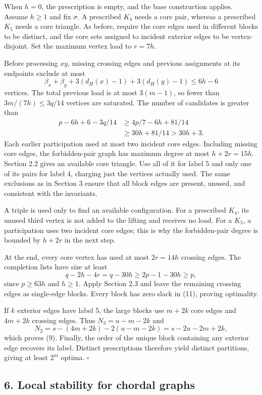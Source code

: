 \documentclass[english,11pt,a4paper]{article}
\begin{document}
When \(h=0\), the prescription is empty, and the base construction
applies. Assume \(h\ge1\) and fix \(\sigma\). A prescribed \(K_4\) needs
a core pair, whereas a prescribed \(K_5\) needs a core triangle. As
before, require the core edges used in different blocks to be distinct,
and the core sets assigned to incident exterior edges to be
vertex-disjoint. Set the maximum vertex load to \(r=7h\).

Before processing \(xy\), missing crossing edges and previous
assignments at its endpoints exclude at most \[
\beta_x+\beta_y+3(d_H(x)-1)+3(d_H(y)-1)\le6h-6
\] vertices. The total previous load is at most \(3(m-1)\), so fewer
than \(3m/(7h)\le3q/14\) vertices are saturated. The number of
candidates is greater than \[
\begin{aligned}
p-6h+6-3q/14
&\ge4p/7-6h+81/14\\
&\ge30h+81/14>30h+3.
\end{aligned} \tag{19}
\] Each earlier participation used at most two incident core edges.
Including missing core edges, the forbidden-pair graph has maximum
degree at most \(h+2r=15h\). Section 2.2 gives an available core
triangle. Use all of it for label 5 and only one of its pairs for label
4, charging just the vertices actually used. The same exclusions as in
Section 3 ensure that all block edges are present, unused, and
consistent with the invariants.

A triple is used only to find an available configuration. For a
prescribed \(K_4\), its unused third vertex is not added to the lifting
and receives no load. For a \(K_5\), a participation uses two incident
core edges; this is why the forbidden-pair degree is bounded by \(h+2r\)
in the next step.

At the end, every core vertex has used at most \(2r=14h\) crossing
edges. The completion lists have size at least \[
q-2h-4r=q-30h\ge2p-1-30h\ge p,
\] since \(p\ge63h\) and \(h\ge1\). Apply Section 2.3 and leave the
remaining crossing edges as single-edge blocks. Every block has zero
slack in (11), proving optimality.

If \(k\) exterior edges have label 5, the large blocks use \(m+2k\) core
edges and \(4m+2k\) crossing edges. Thus \(N_3=u-m-2k\) and \[
N_2=s-(4m+2k)-2(u-m-2k)=s-2u-2m+2k,
\] which proves (9). Finally, the order of the unique block containing
any exterior edge recovers its label. Distinct prescriptions therefore
yield distinct partitions, giving at least \(2^m\) optima. \(\square\)

\subsection{6. Local stability for chordal
graphs}\label{local-stability-for-chordal-graphs}
\end{document}
